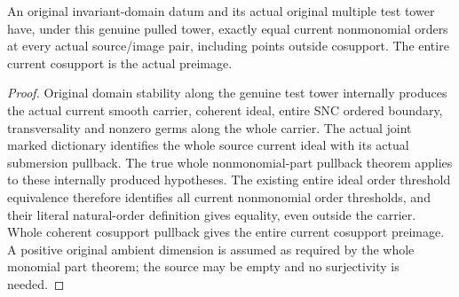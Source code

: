\begin{theorem}
\label{hir:submersion-history-current-order}
\leanok
An original invariant-domain datum and its actual original multiple test
tower have, under this genuine pulled tower, exactly equal current
nonmonomial orders at every actual source/image pair, including points
outside cosupport. The entire current cosupport is the actual preimage.
\end{theorem}
\begin{proof}
Original domain stability along the genuine test tower internally produces
the actual current smooth carrier, coherent ideal, entire SNC ordered
boundary, transversality and nonzero germs along the whole carrier. The
actual joint marked dictionary identifies the whole source current ideal
with its actual submersion pullback. The true whole nonmonomial-part
pullback theorem applies to these internally produced hypotheses. The
existing entire ideal order threshold equivalence therefore identifies
all current nonmonomial order thresholds, and their literal natural-order
definition gives equality, even outside the carrier. Whole coherent
cosupport pullback gives the entire current cosupport preimage. A positive
original ambient dimension is assumed as required by the whole monomial
part theorem; the source may be empty and no surjectivity is needed.
\end{proof}

